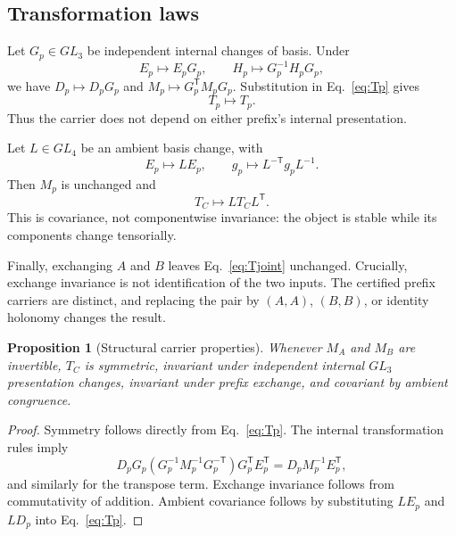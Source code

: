 \documentclass[11pt]{article}
\newtheorem{proposition}[theorem]{Proposition}
\theoremstyle{definition}
\theoremstyle{remark}
\begin{document}
\subsection{Transformation laws}

Let $G_p\in GL_3$ be independent internal changes of basis. Under
\begin{equation}\label{eq:internalgauge}
 E_p\mapsto E_pG_p,\qquad
 H_p\mapsto G_p^{-1}H_pG_p,
\end{equation}
we have $D_p\mapsto D_pG_p$ and $M_p\mapsto G_p^{\mathsf T}M_pG_p$. Substitution in Eq.~\eqref{eq:Tp} gives
\begin{equation}\label{eq:gaugeinvariance}
 T_p\mapsto T_p.
\end{equation}
Thus the carrier does not depend on either prefix's internal presentation.

Let $L\in GL_4$ be an ambient basis change, with
\begin{equation}
 E_p\mapsto LE_p,\qquad g_p\mapsto L^{-\mathsf T}g_pL^{-1}.
\end{equation}
Then $M_p$ is unchanged and
\begin{equation}\label{eq:ambientcovariance}
 T_C\mapsto LT_CL^{\mathsf T}.
\end{equation}
This is covariance, not componentwise invariance: the object is stable while its components change tensorially.

Finally, exchanging $A$ and $B$ leaves Eq.~\eqref{eq:Tjoint} unchanged. Crucially, exchange invariance is not identification of the two inputs. The certified prefix carriers are distinct, and replacing the pair by $(A,A)$, $(B,B)$, or identity holonomy changes the result.

\begin{proposition}[Structural carrier properties]\label{prop:structural}
Whenever $M_A$ and $M_B$ are invertible, $T_C$ is symmetric, invariant under independent internal $GL_3$ presentation changes, invariant under prefix exchange, and covariant by ambient congruence.
\end{proposition}

\begin{proof}
Symmetry follows directly from Eq.~\eqref{eq:Tp}. The internal transformation rules imply
\[
 D_pG_p(G_p^{-1}M_p^{-1}G_p^{-\mathsf T})G_p^{\mathsf T}E_p^{\mathsf T}
 =D_pM_p^{-1}E_p^{\mathsf T},
\]
and similarly for the transpose term. Exchange invariance follows from commutativity of addition. Ambient covariance follows by substituting $LE_p$ and $LD_p$ into Eq.~\eqref{eq:Tp}.
\end{proof}
\end{document}
